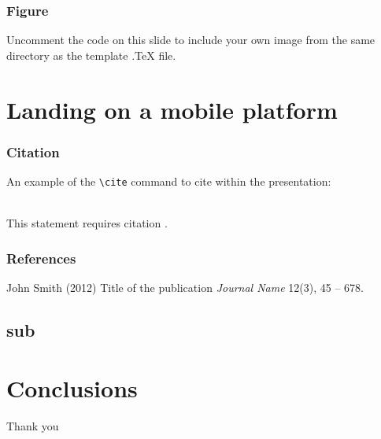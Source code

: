 \documentclass[xcolor=dvipsnames]{beamer}
\begin{document}

\begin{frame}
\frametitle{Figure}
Uncomment the code on this slide to include your own image from the same directory as the template .TeX file.
\end{frame}

\section{Landing on a mobile platform}

\begin{frame}
\tableofcontents[sectionstyle=show,square,currentsection]
\end{frame}

\begin{frame}[fragile] %
\frametitle{Citation}
An example of the \verb|\cite| command to cite within the presentation:\\~

This statement requires citation \cite{p1}.
\end{frame}


\begin{frame}
\frametitle{References}
\footnotesize{
\begin{thebibliography}{99} %
 John Smith (2012)
\newblock Title of the publication
\newblock \emph{Journal Name} 12(3), 45 -- 678.
\end{thebibliography}
}
\end{frame}
\subsection*{sub}

\begin{frame}

\end{frame}

\section{Conclusions}

\begin{frame}
\tableofcontents[sectionstyle=show,square,currentsection]
\end{frame}

\begin{frame}
\Huge{\centerline{Thank you}}
\end{frame}

\end{document}
